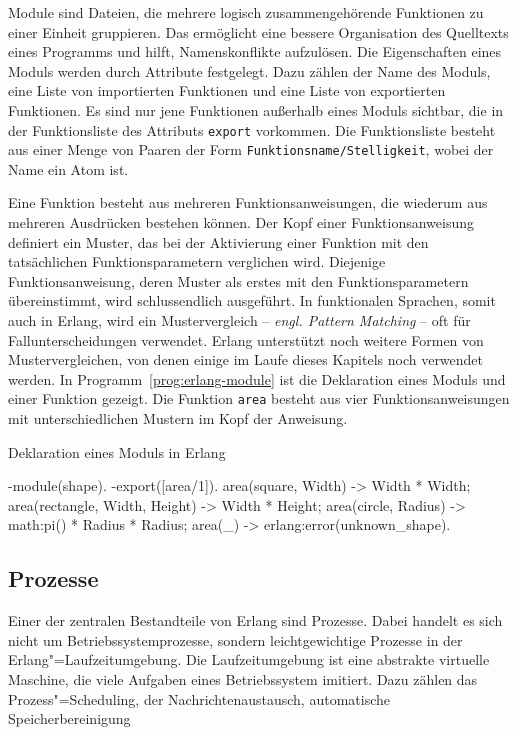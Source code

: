 Module sind Dateien, die mehrere logisch zusammengehörende Funktionen zu einer Einheit gruppieren. Das ermöglicht eine bessere Organisation des Quelltexts eines Programms und hilft, Namenskonflikte aufzulösen. Die Eigenschaften eines Moduls werden durch Attribute festgelegt. Dazu zählen \zB der Name des Moduls, eine Liste von importierten Funktionen und eine Liste von exportierten Funktionen. Es sind nur jene Funktionen außerhalb eines Moduls sichtbar, die in der Funktionsliste des Attributs \lstinline{export} vorkommen. Die Funktionsliste besteht aus einer Menge von Paaren der Form \lstinline{Funktionsname/Stelligkeit}, wobei der Name ein Atom ist.

Eine Funktion besteht aus mehreren Funktionsanweisungen, die wiederum aus mehreren Ausdrücken bestehen können. Der Kopf einer Funktionsanweisung definiert ein Muster, das bei der Aktivierung einer Funktion mit den tatsächlichen Funktionsparametern verglichen wird. Diejenige Funktionsanweisung, deren Muster als erstes mit den Funktionsparametern übereinstimmt, wird schlussendlich ausgeführt. In funktionalen Sprachen, somit auch in Erlang, wird ein Mustervergleich -- \textit{engl. Pattern Matching} -- oft für Fallunterscheidungen verwendet. Erlang unterstützt noch weitere Formen von Mustervergleichen, von denen einige im Laufe dieses Kapitels noch verwendet werden. In Programm~\ref{prog:erlang-module} ist die Deklaration eines Moduls und einer Funktion gezeigt. Die Funktion \lstinline{area} besteht aus vier Funktionsanweisungen mit unterschiedlichen Mustern im Kopf der Anweisung.

\begin{program}[!hbt]
\caption{Deklaration eines Moduls in Erlang}
\label{prog:erlang-module}
\begin{ErlangCode}
-module(shape).
-export([area/1]).
area({square, Width}) -> Width * Width;
area({rectangle, Width, Height}) -> Width * Height;
area({circle, Radius}) -> math:pi() * Radius * Radius;
area(_) -> erlang:error(unknown_shape).
\end{ErlangCode}
\end{program}

\subsection{Prozesse}
\label{subsec:erlang-processes}

Einer der zentralen Bestandteile von Erlang sind Prozesse. Dabei handelt es sich nicht um Betriebssystemprozesse, sondern leichtgewichtige Prozesse in der Erlang"=Laufzeitumgebung. Die Laufzeitumgebung ist eine abstrakte virtuelle Maschine, die viele Aufgaben eines Betriebssystem imitiert. Dazu zählen das Prozess"=Scheduling, der Nachrichtenaustausch, automatische Speicherbereinigung \usw

